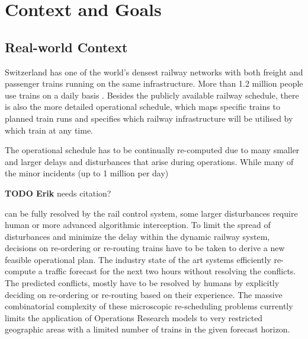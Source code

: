 \documentclass{article}
\begin{document}
\section{Context and Goals}

\subsection{Real-world Context}
Switzerland has one of the world's densest railway networks with both freight and passenger trains running on the same infrastructure. More than 1.2 million people use trains on a daily basis \cite{rcsbrochure}.
Besides the publicly available railway schedule, there is also the more detailed operational schedule, which maps specific trains to planned train runs and specifies which railway infrastructure will be utilised by which train at any time.

The operational schedule has to be continually re-computed due to many smaller and larger delays and disturbances that arise during operations. While many of the minor incidents (up to 1 million per day)
\begin{mdframed}
{\bf TODO Erik} needs citation?
\end{mdframed}
can be fully resolved by the rail control system, some larger disturbances require human or more advanced algorithmic interception. To limit the spread of disturbances and minimize the delay within the dynamic railway system, decisions on re-ordering or re-routing trains have to be taken to derive a new feasible operational plan. The industry state of the art systems efficiently re-compute a traffic forecast for the next two hours without resolving the conflicts. The predicted conflicts, mostly have to be resolved by humans by explicitly deciding on re-ordering or re-routing based on their experience. The massive combinatorial complexity of these microscopic re-scheduling problems currently limits the application of Operations Research models to very restricted geographic areas with a limited number of trains in the given forecast horizon.
\end{document}
